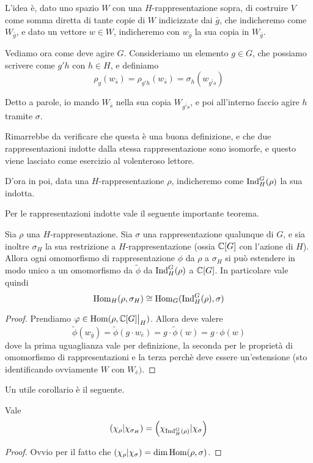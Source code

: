		L'idea è, dato uno spazio $W$ con una $H$-rappresentazione sopra, di costruire $V$ come somma diretta di tante copie di $W$ indicizzate dai $\bar g$, che indicheremo come $W_{\bar g}$, e dato un vettore $w\in W$, indicheremo con $w_{\bar g}$ la sua copia in $W_{\bar g}$. 
		
		Vediamo ora come deve agire $G$. Consideriamo un elemento $g\in G$, che possiamo scrivere come $g'h$ con $h\in H$, e definiamo
		\[
			\rho_g(w_{\bar s}) = \rho_{g'h}(w_{\bar s})= \sigma_h(w_{\bar{g's}})
		\]
		
		Detto a parole, io mando $W_{\bar s}$ nella sua copia $W_{\bar {g's}}$, e poi all'interno faccio agire $h$ tramite $\sigma$. 
		
		Rimarrebbe da verificare che questa è una buona definizione, e che due rappresentazioni indotte dalla stessa rappresentazione sono isomorfe, e questo viene lasciato come esercizio al volenteroso lettore.
		
		D'ora in poi, data una $H$-rappresentazione $\rho$, indicheremo come $\operatorname{Ind}_H^G(\rho)$ la sua indotta.
		
		Per le rappresentazioni indotte vale il seguente importante teorema.
		\begin{mytheorem}
			Sia $\rho$ una $H$-rappresentazione. Sia $\sigma$ una rappresentazione qualunque di $G$, e sia inoltre $\sigma_H$ la sua restrizione a $H$-rappresentazione (ossia $\mathbb C[G]$ con l'azione di $H$). Allora ogni omomorfismo di rappresentazione $\phi$ da $\rho$ a $\sigma_H$ si può estendere in modo unico a un omomorfismo da $\tilde\phi$ da $\operatorname{Ind}_H^G(\rho)$ a $\mathbb C[G]$. In particolare vale quindi
			\[
				\operatorname{Hom}_H(\rho, \sigma_H) \cong \operatorname{Hom}_G(\operatorname{Ind}_H^G(\rho), \sigma)
			\]
		\end{mytheorem}
		\begin{proof}
			Prendiamo $\phi \in \Hom(\rho, \restr{\bC[G]}{H})$. Allora deve valere 
			 \[
				\tilde\phi (w_{\bar g}) = \tilde\phi(g \cdot w_{\bar e}) = g \cdot \tilde\phi(w) = g\cdot \phi (w)			  
			 \]
			dove la prima uguaglianza vale per definizione, la seconda per le proprietà di omomorfismo di rappresentazioni e la terza perchè deve essere un'estensione (sto identificando ovviamente $W$ con $W_{\bar e})$. 
		\end{proof}
		
		Un utile corollario è il seguente.
		\begin{mycor}
		 Vale 
		 \[
		  \left(\chi_\rho | \chi_{\sigma_H}\right) = \left(\chi_{\operatorname{Ind}_H^G(\rho)} | \chi_\sigma\right)
		 \]

		\end{mycor}
		\begin{proof}
			Ovvio per il fatto che $\left(\chi_\rho | \chi_\sigma\right)=\dim \operatorname{Hom} (\rho,\sigma)$.
		\end{proof}
		
